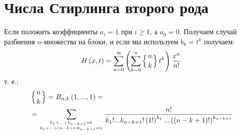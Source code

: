 \section{Числа Стирлинга второго рода}

Если положить коэффициенты $a_i = 1$ при $i\ge1$, а $a_0 = 0$. Получаем случай разбиения $n$-множества на блоки, и если мы используем $b_k = t^k$ получаем:
\begin{equation}
	H\left(x,t\right) = \sum_{n=0}^\infty \left(\sum_{k=0}^n \left\{{{n}\atop{k}}\right\} t^k\right) \frac{x^n}{n!}
\end{equation}
т. е.:
\begin{equation}
	\begin{split}
		& \left\{{{n}\atop{k}}\right\} = B_{n,k}\left(1,...,1\right) = \\
		& = \sum_{{k_1+...+k_{n-k+1}=k}\atop{k_1+...+\left(n-k+1\right)k_{n-k+1}=n}} \frac{n!}{k_1!...k_{n-k+1}!\left(1!\right)^{k_1}...\left(\left(n-k+1\right)!\right)^{k_{n-k+1}}}
	\end{split}
\end{equation}
